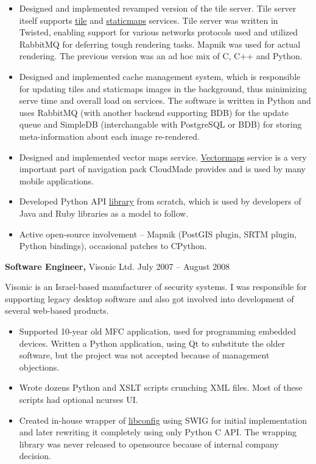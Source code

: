 \documentclass[margin]{res}
\begin{document}
\begin{resume}
\begin{itemize} \itemsep -1pt
\item Designed and implemented revamped version of the tile
  server. Tile server itself supports
  \href{http://developers.cloudmade.com/projects/show/tiles}{tile} and
  \href{http://developers.cloudmade.com/projects/show/static-maps}{staticmaps}
  services. Tile server was written in Twisted, enabling support for various
  networks protocols used and utilized RabbitMQ for deferring tough rendering
  tasks. Mapnik was used for actual rendering.
  The previous version was an ad hoc mix of C, C++ and Python.
\item Designed and implemented cache management system, which is
  responsible for updating tiles and staticmaps images in the
  background, thus minimizing serve time and overall load on
  services. The software is written in Python and uses RabbitMQ
  (with another backend supporting BDB) for the update queue and
  SimpleDB (interchangable with PostgreSQL or BDB) for storing
  meta-information about each image re-rendered.
\item Designed and implemented vector maps service.
  \href{http://developers.cloudmade.com/projects/show/vector-stream-server}{Vectormaps}
  service is a very important part of
  navigation pack CloudMade provides and is used by many
  mobile applications.
\item Developed Python API
  \href{http://developers.cloudmade.com/projects/show/python-lib}{library}
  from scratch,
  which is  used by developers of Java and Ruby
  libraries as a model to follow.
\item Active open-source involvement -- Mapnik
  (PostGIS plugin, SRTM plugin,
  Python bindings), occasional patches to CPython.
\end{itemize}

{\bf Software Engineer,} Visonic Ltd. \hfill July 2007 -- August 2008

Visonic is an Israel-based manufacturer of security systems.
I was responsible for supporting legacy desktop software and
also got involved into development of several web-based
products.\\

\begin{itemize} \itemsep -1pt
\item Supported 10-year old MFC application, used for programming
  embedded devices. Written a Python application, using Qt to
  substitute the older software, but the project was not accepted
  because of management objections.
\item Wrote dozens Python and XSLT scripts
  crunching XML files. Most of these scripts had optional ncurses UI.
\item Created in-house wrapper of
  \href{http://www.hyperrealm.com/libconfig/}{libconfig} using SWIG for initial
  implementation and later rewriting it completely using only Python C API.
  The wrapping library was never released to opensource because of
  internal company decision.
\end{itemize}




\end{resume}
\end{document}
